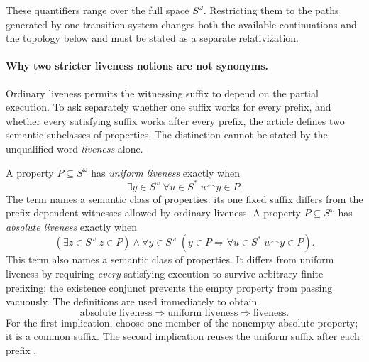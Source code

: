 These quantifiers range over the full space \(S^\omega\).  Restricting them to
the paths generated by one transition system changes both the available
continuations and the topology below and must be stated as a separate
relativization.

\paragraph{Why two stricter liveness notions are not synonyms.}
Ordinary liveness permits the witnessing suffix to depend on the partial
execution.  To ask separately whether one suffix works for every prefix, and
whether every satisfying suffix works after every prefix, the article defines
two semantic subclasses of properties.  The distinction cannot be stated by
the unqualified word \emph{liveness} alone.

A property \(P\subseteq S^\omega\) has \emph{uniform liveness} exactly when
\[
 \exists y\in S^\omega\;
 \forall u\in S^*\;
 u\mathbin{\smallfrown}y\in P.
\]
The term names a semantic class of properties: its one fixed suffix differs
from the prefix-dependent witnesses allowed by ordinary liveness.  A property
\(P\subseteq S^\omega\) has \emph{absolute liveness} exactly when
\[
 \left(\exists z\in S^\omega\;z\in P\right)
 \land
 \forall y\in S^\omega\;
 \left(
  y\in P
  \Longrightarrow
  \forall u\in S^*\;
  u\mathbin{\smallfrown}y\in P
 \right).
\]
This term also names a semantic class of properties.  It differs from uniform
liveness by requiring \emph{every} satisfying execution to survive arbitrary
finite prefixing; the existence conjunct prevents the empty property from
passing vacuously.  The definitions are used immediately to obtain
\[
 \text{absolute liveness}
 \Longrightarrow
 \text{uniform liveness}
 \Longrightarrow
 \text{liveness}.
\]
For the first implication, choose one member of the nonempty absolute
property; it is a common suffix.  The second implication reuses the uniform
suffix after each prefix \cite[p.~183]{AlpernSchneider1985}.

